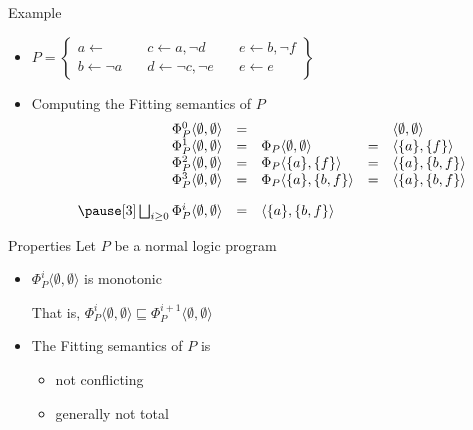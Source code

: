 \begin{frame}{Example}
  \bigskip
  \begin{itemize}
  \item<1->
    \(
    P
    =
    \left\{
      \begin{array}{lll}
        a \leftarrow                \quad &
        c \leftarrow a, \neg d      \quad &
        e \leftarrow b, \neg f
        \\
        b \leftarrow \neg a         \quad &
        d \leftarrow \neg c, \neg e \quad &
        e \leftarrow e
      \end{array}
    \right\}
    \)
  \bigskip
  \item<2-> Computing the Fitting semantics of $P$
    \[
    \begin{array}{rclcl}
      \Phi_P^0\langle\emptyset,\emptyset\rangle&=&                                              & &\langle\emptyset,\emptyset\rangle
      \\
      \Phi_P^1\langle\emptyset,\emptyset\rangle&=&\Phi_P\langle\emptyset,\emptyset\rangle&=&\langle\{a\}    ,\{f\}    \rangle
      \\
      \Phi_P^2\langle\emptyset,\emptyset\rangle&=&\Phi_P\langle\{a\}    ,\{f\}    \rangle&=&\langle\{a\}    ,\{b,f\}  \rangle
      \\
      \Phi_P^3\langle\emptyset,\emptyset\rangle&=&\Phi_P\langle\{a\}    ,\{b,f\}  \rangle&=&\langle\{a\}    ,\{b,f\}  \rangle%
      \\[10pt]\pause[3]
      \bigsqcup_{i \geq 0}\Phi_P^i\langle\emptyset,\emptyset\rangle&=&\langle \{a\}, \{b,f\} \rangle
    \end{array}
    \]
  \end{itemize}
\end{frame}
\begin{frame}{Properties}
  \bigskip
  Let $P$ be a normal logic program
  \medskip
  \begin{itemize}
  \item $\Phi_P^i\langle \emptyset, \emptyset \rangle$ is monotonic
    \smallskip

    That is,
    \(
    \Phi_P^i\langle \emptyset, \emptyset \rangle
    \sqsubseteq
    \Phi_P^{i+1}\langle \emptyset, \emptyset \rangle
    \)
    \medskip
  \item The Fitting semantics of $P$ is
    \begin{itemize}\normalsize
    \item not conflicting
    \item generally not total
    \end{itemize}
  \end{itemize}
\end{frame}
